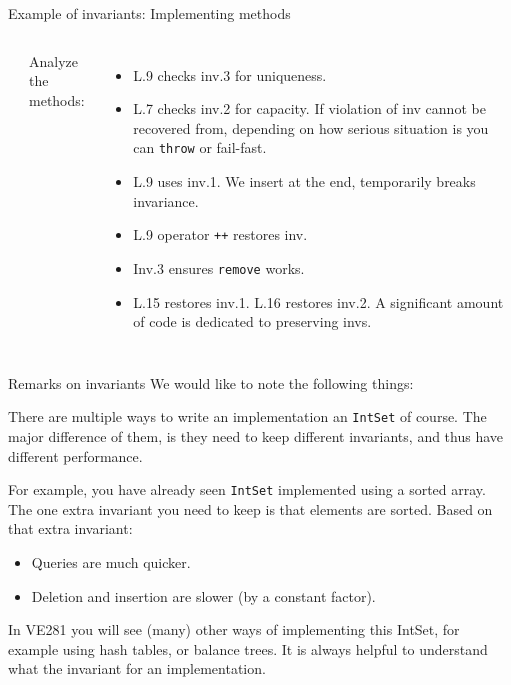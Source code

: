 \begin{frame}{Example of invariants: Implementing methods}
\begin{columns}
	
	\vspace{-.3in}
	
	\inputminted[fontsize=\small,xleftmargin=1em, linenos]{c++}{code/rc8intset/intset.cpp}
	
	
	\vspace{-.25in}
	
	Analyze the methods:
	\begin{itemize}
		\item L.9 checks inv.3 for uniqueness.
		\item L.7 checks inv.2 for capacity. If violation of inv cannot be recovered from, depending on how serious situation is you can \texttt{throw} or fail-fast.
		\item L.9 uses inv.1. We insert at the end, temporarily breaks invariance.
		\item L.9 operator \texttt{++} restores inv.
		\item Inv.3 ensures \texttt{remove} works.
		\item L.15 restores inv.1. L.16 restores inv.2. A significant amount of code is dedicated to preserving invs.
	\end{itemize}
\end{columns}
\end{frame}


\begin{frame}{Remarks on invariants}
We would like to note the following things:
\begin{center}
\end{center}
There are multiple ways to write an implementation an \texttt{IntSet} of course. The major difference of them, is they need to keep different invariants, and thus have different performance. 

For example, you have already seen \texttt{IntSet} implemented using a sorted array. The one extra invariant you need to keep is that elements are sorted. Based on that extra invariant:
\begin{itemize}
	\item Queries are much quicker.
	\item Deletion and insertion are slower (by a constant factor).
\end{itemize}
In VE281 you will see (many) other ways of implementing this IntSet, for example using hash tables, or balance trees. It is always helpful to understand what the invariant for an implementation.
\end{frame}

